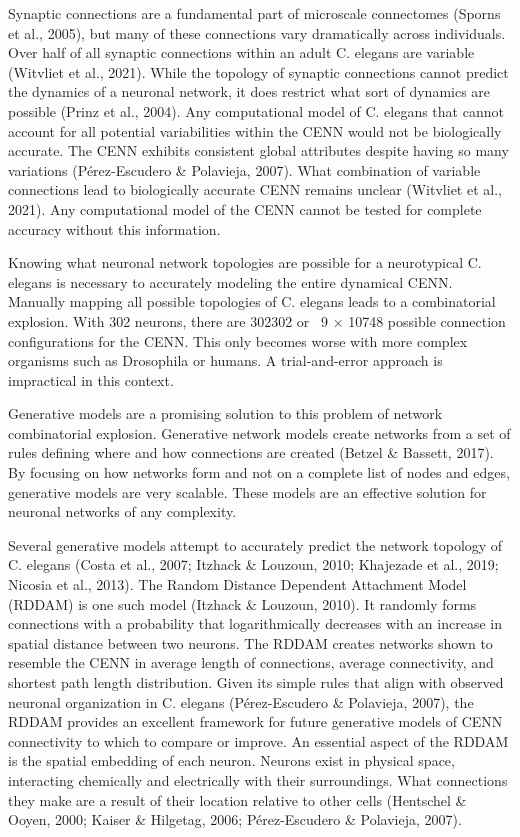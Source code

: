 Synaptic connections are a fundamental part of microscale connectomes (Sporns et al., 2005), but many of these connections vary dramatically across individuals. Over half of all synaptic connections within an adult C. elegans are variable (Witvliet et al., 2021). While the topology of synaptic connections cannot predict the dynamics of a neuronal network, it does restrict what sort of dynamics are possible (Prinz et al., 2004). Any computational model of C. elegans that cannot account for all potential variabilities within the CENN would not be biologically accurate. The CENN exhibits consistent global attributes despite having so many variations (Pérez-Escudero \& Polavieja, 2007). What combination of variable connections lead to biologically accurate CENN remains unclear (Witvliet et al., 2021). Any computational model of the CENN cannot be tested for complete accuracy without this information. 

Knowing what neuronal network topologies are possible for a neurotypical C. elegans is necessary to accurately modeling the entire dynamical CENN. Manually mapping all possible topologies of C. elegans leads to a combinatorial explosion. With 302 neurons, there are 302302 or ~9 × 10748 possible connection configurations for the CENN. This only becomes worse with more complex organisms such as Drosophila or humans. A trial-and-error approach is impractical in this context.

Generative models are a promising solution to this problem of network combinatorial explosion. Generative network models create networks from a set of rules defining where and how connections are created (Betzel \& Bassett, 2017). By focusing on how networks form and not on a complete list of nodes and edges, generative models are very scalable. These models are an effective solution for neuronal networks of any complexity. 

Several generative models attempt to accurately predict the network topology of C. elegans (Costa et al., 2007; Itzhack \& Louzoun, 2010; Khajezade et al., 2019; Nicosia et al., 2013). The Random Distance Dependent Attachment Model (RDDAM) is one such model (Itzhack \& Louzoun, 2010). It randomly forms connections with a probability that logarithmically decreases with an increase in spatial distance between two neurons. The RDDAM creates networks shown to resemble the CENN in average length of connections, average connectivity, and shortest path length distribution. Given its simple rules that align with observed neuronal organization in C. elegans (Pérez-Escudero \& Polavieja, 2007), the RDDAM provides an excellent framework for future generative models of CENN connectivity to which to compare or improve. An essential aspect of the RDDAM is the spatial embedding of each neuron. Neurons exist in physical space, interacting chemically and electrically with their surroundings. What connections they make are a result of their location relative to other cells (Hentschel \& Ooyen, 2000; Kaiser \& Hilgetag, 2006; Pérez-Escudero \& Polavieja, 2007). 

